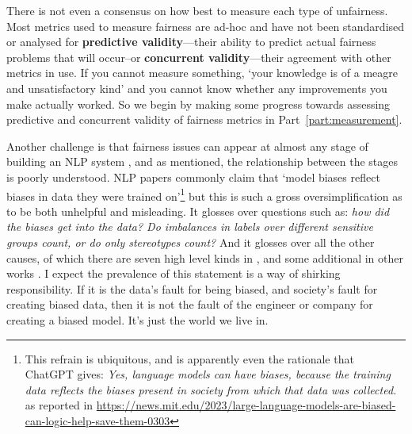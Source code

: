 There is not even a consensus on how best to measure each type of unfairness. Most metrics used to measure fairness are ad-hoc and have not been standardised or analysed for \textbf{predictive validity}---their ability to predict actual fairness problems that will occur--or \textbf{concurrent validity}---their agreement with other metrics in use. If you cannot measure something, `your knowledge is of a meagre and unsatisfactory kind' \citep{kelvin1891popular} and you cannot know whether any improvements you make actually worked. So we begin by making some progress towards assessing predictive and concurrent validity of fairness metrics in Part~\ref{part:measurement}.  

Another challenge is that fairness issues can appear at almost any stage of building an NLP system \citep{suresh2021framework}, and as mentioned, the relationship between the stages is poorly understood. NLP papers commonly claim that `model biases reflect biases in data they were trained on'\footnote{This refrain is ubiquitous, and is apparently even the rationale that ChatGPT gives: \textit{Yes, language models can have biases, because the training data reflects the biases present in society from which that data was collected.} as reported in \url{https://news.mit.edu/2023/large-language-models-are-biased-can-logic-help-save-them-0303}} 
but this is such a gross oversimplification as to be both unhelpful and misleading. It glosses over questions such as: \textit{how did the biases get into the data? Do imbalances in labels over different sensitive groups count, or do only stereotypes count?} And it glosses over all the other causes, of which there are seven high level kinds in \citet{suresh2021framework}, and some additional in other works \citep{mehrabi_survey}. I expect the prevalence of this statement is a way of shirking responsibility. If it is the data's fault for being biased, and society's fault for creating biased data, then it is not the fault of the engineer or company for creating a biased model. It's just the world we live in. 

